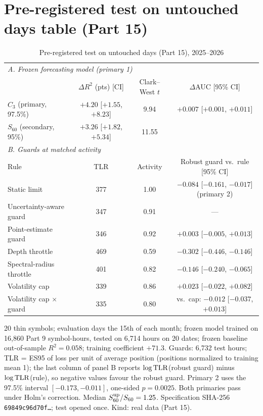 \documentclass[12pt]{article}
\theoremstyle{definition}
\theoremstyle{remark}
\begin{document}
\section{Pre-registered test on untouched days table (Part 15)}
\FloatBarrier
\begin{table}[!tbp]\centering\small
\begin{threeparttable}
\caption{Pre-registered test on untouched days (Part 15), 2025--2026}\label{tab:p15}
\footnotesize\setlength{\tabcolsep}{2.5pt}
\begin{tabular}{lccc}
\toprule
\multicolumn{4}{l}{\emph{A. Frozen forecasting model (primary 1)}}\\
 & $\Delta R^2$ (pts) [CI] & Clark--West $t$ & $\Delta$AUC [95\% CI]\\
\midrule
$\hat C_3$ (primary, 97.5\%) & $+4.20$ [$+1.55$, $+8.23$] & 9.94 & $+0.007$ [$+0.001$, $+0.011$]\\
$S_{60}$ (secondary, 95\%) & $+3.26$ [$+1.82$, $+5.34$] & 11.55 & \\
\midrule
\multicolumn{4}{l}{\emph{B. Guards at matched activity}}\\
Rule & TLR & Activity & Robust guard vs.\ rule [95\% CI]\\
\midrule
Static limit & 377 & 1.00 & $-0.084$ [$-0.161$, $-0.017$] (primary 2)\\
Uncertainty-aware guard & 347 & 0.91 & ---\\
Point-estimate guard & 346 & 0.92 & $+0.003$ [$-0.005$, $+0.013$]\\
Depth throttle & 469 & 0.59 & $-0.302$ [$-0.446$, $-0.146$]\\
Spectral-radius throttle & 401 & 0.82 & $-0.146$ [$-0.240$, $-0.065$]\\
Volatility cap & 339 & 0.86 & $+0.023$ [$-0.022$, $+0.082$]\\
Volatility cap $\times$ guard & 335 & 0.80 & vs.\ cap: $-0.012$ [$-0.037$, $+0.013$]\\
\bottomrule
\end{tabular}
\begin{tablenotes}\footnotesize\item 20 thin symbols; evaluation days the 15th of each month; frozen model trained on 16{,}860 Part 9 symbol-hours, tested on 6{,}714 hours on 20 dates; frozen baseline out-of-sample $R^2=0.058$; training coefficient $+71.3$. Guards: 6{,}732 test hours; TLR = ES95 of loss per unit of average position (positions normalized to training mean 1); the last column of panel B reports $\log{\rm TLR}$(robust guard) minus $\log{\rm TLR}$(rule), so negative values favour the robust guard. Primary 2 uses the 97.5\% interval $[-0.173,-0.011]$, one-sided $p=0.0025$. Both primaries pass under Holm's correction. Median $S^{\rm up}_{60}/S_{60}=1.25$. Specification SHA-256 \texttt{69849c96d70f\ldots}; test opened once. Kind: real data (Part 15).\end{tablenotes}
\end{threeparttable}
\end{table}
\FloatBarrier
\end{document}
